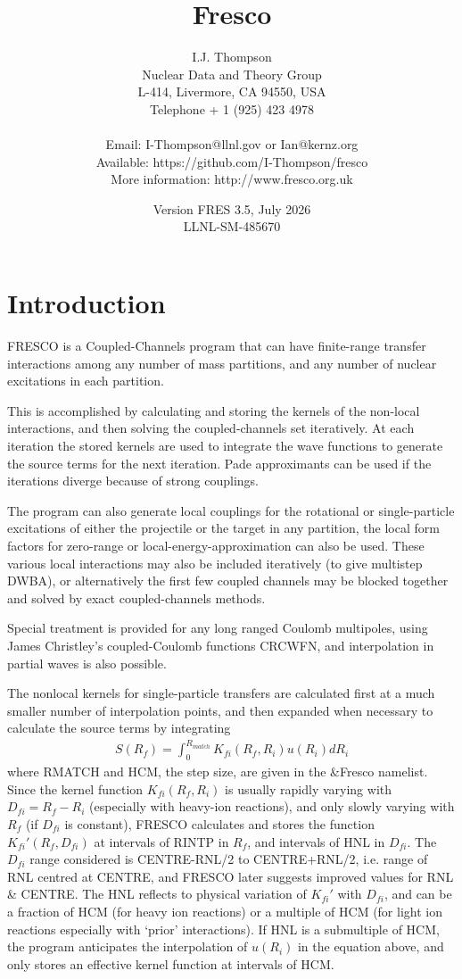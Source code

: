 \documentclass[11pt]{article}
\title{\Huge Fresco}
\date{Version FRES 3.5, July 2026\\  LLNL-SM-485670}
\author{I.J. Thompson
%
\\Nuclear Data and Theory Group
\\ L-414,
 Livermore, CA 94550, USA
\\Telephone + 1 (925) 423 4978
\\ %
\\Email: I-Thompson@llnl.gov or Ian@kernz.org
\\Available: https://github.com/I-Thompson/fresco
\\More information: http://www.fresco.org.uk }
\newcommand{\beqn}{\begin{eqnarray}}
\newcommand{\eeqn}{\end{eqnarray}}
\begin{document}
\maketitle
\tableofcontents
\newpage
\section{Introduction}

\parskip 5pt
\parindent 10pt

FRESCO is a Coupled-Channels program that can have finite-range
transfer interactions among any number of mass partitions, and any
number of nuclear excitations in each partition.

This is accomplished by calculating and storing the kernels of the
non-local interactions, and then solving the coupled-channels set
iteratively.
At each iteration the stored kernels are used to integrate the wave
functions to generate the source terms for the next iteration.
Pade approximants can be used if the iterations diverge because of
strong couplings.

The program can also generate local couplings for the rotational
or single-particle excitations of either the projectile or the
target in any partition,
the local form factors for zero-range or local-energy-approximation
can also be used.
These various local interactions may also be included iteratively
(to give multistep DWBA), or alternatively the first few coupled
channels may be blocked together and solved by exact coupled-channels
methods.

Special treatment is provided for any long ranged Coulomb multipoles,
using James Christley's coupled-Coulomb functions CRCWFN,
and interpolation in partial waves is also possible.

The nonlocal kernels for single-particle transfers are calculated first
at a much smaller number of interpolation points,
and then expanded when necessary to calculate the source terms by
integrating
\beqn
S(R _ f ) = \int _ 0 ^ {R _ {match}}
                K _ {fi} (R _ f , R _ i ) u(R _ i ) dR _ i
\eeqn
where RMATCH and HCM, the step size, are given in the \&Fresco namelist.
Since the kernel function $K_{fi}(R_f,R_i)$ is usually rapidly varying with
$D_{fi} = R_{f} - R_{i}$ (especially with heavy-ion reactions), and only slowly
varying with $R_{f}$ (if $D_{fi}$ is constant),  FRESCO calculates and stores
the function $K_{fi}'(R_{f},D_{fi})$ at intervals of RINTP in $R_{f}$,
and intervals of HNL in $D_{fi}$. The $D_{fi}$ range considered is
CENTRE-RNL/2 to CENTRE+RNL/2, i.e. range of RNL centred at CENTRE,
and FRESCO later suggests improved values for RNL \& CENTRE.
The HNL reflects to physical variation of $K_{fi}'$ with $D_{fi}$, and can be
a fraction of HCM (for heavy ion reactions) or a multiple of HCM
(for light ion reactions especially with `prior' interactions).
If HNL is a submultiple of HCM, the program anticipates the interpolation
of $u(R_{i})$ in the equation above, and only stores an effective kernel
function at intervals of HCM.
\end{document}
